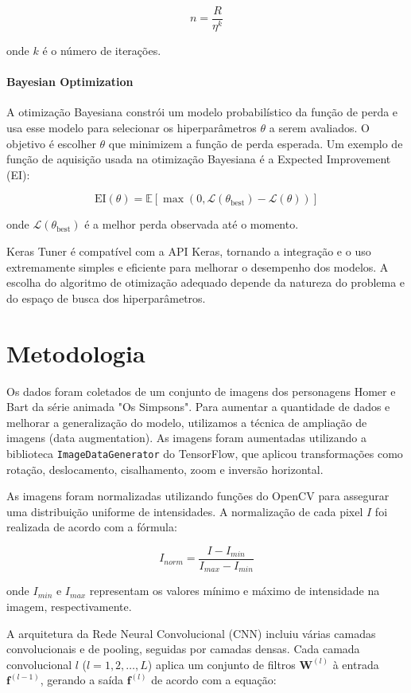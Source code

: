 \documentclass{article}
\begin{document}
\[
n = \frac{R}{\eta^k}
\]

onde \( k \) é o número de iterações.

\paragraph{Bayesian Optimization}

A otimização Bayesiana constrói um modelo probabilístico da função de perda e usa esse modelo para selecionar os hiperparâmetros \( \theta \) a serem avaliados. O objetivo é escolher \( \theta \) que minimizem a função de perda esperada. Um exemplo de função de aquisição usada na otimização Bayesiana é a Expected Improvement (EI):

\[
\text{EI}(\theta) = \mathbb{E}[\max(0, \mathcal{L}(\theta_{\text{best}}) - \mathcal{L}(\theta))]
\]

onde \( \mathcal{L}(\theta_{\text{best}}) \) é a melhor perda observada até o momento.

Keras Tuner é compatível com a API Keras, tornando a integração e o uso extremamente simples e eficiente para melhorar o desempenho dos modelos. A escolha do algoritmo de otimização adequado depende da natureza do problema e do espaço de busca dos hiperparâmetros.

\section{Metodologia}

Os dados foram coletados de um conjunto de imagens dos personagens Homer e Bart da série animada "Os Simpsons". Para aumentar a quantidade de dados e melhorar a generalização do modelo, utilizamos a técnica de ampliação de imagens (data augmentation). As imagens foram aumentadas utilizando a biblioteca \texttt{ImageDataGenerator} do TensorFlow, que aplicou transformações como rotação, deslocamento, cisalhamento, zoom e inversão horizontal.

As imagens foram normalizadas utilizando funções do OpenCV para assegurar uma distribuição uniforme de intensidades. A normalização de cada pixel \( I \) foi realizada de acordo com a fórmula:

\[
I_{norm} = \frac{I - I_{min}}{I_{max} - I_{min}}
\]

onde \( I_{min} \) e \( I_{max} \) representam os valores mínimo e máximo de intensidade na imagem, respectivamente.

A arquitetura da Rede Neural Convolucional (CNN) incluiu várias camadas convolucionais e de pooling, seguidas por camadas densas. Cada camada convolucional \( l \) (\( l = 1, 2, \ldots, L \)) aplica um conjunto de filtros \( \mathbf{W}^{(l)} \) à entrada \( \mathbf{f}^{(l-1)} \), gerando a saída \( \mathbf{f}^{(l)} \) de acordo com a equação:
\end{document}
